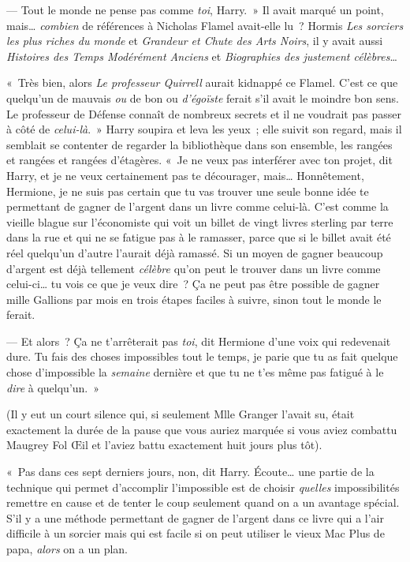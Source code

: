 --- Tout le monde ne pense pas comme \emph{toi}, Harry.~»
Il avait marqué un point, mais…
\emph{combien} de références à Nicholas Flamel avait-elle lu~?
Hormis \emph{Les sorciers les plus riches du monde} et \emph{Grandeur et Chute des Arts Noirs}, il y avait aussi \emph{Histoires des Temps Modérément Anciens} et \emph{Biographies des justement célèbres}…

«~Très bien, alors \emph{Le professeur Quirrell} aurait kidnappé ce Flamel.
C'est ce que quelqu'un de mauvais \emph{ou} de bon ou \emph{d'égoïste} ferait s'il avait le moindre bon sens.
Le professeur de Défense connaît de nombreux secrets et il ne voudrait pas passer à côté de \emph{celui-là}.~»
Harry soupira et leva les yeux~; elle suivit son regard, mais il semblait se contenter de regarder la bibliothèque dans son ensemble, les rangées et rangées et rangées d'étagères.
«~Je ne veux pas interférer avec ton projet, dit Harry, et je ne veux certainement pas te décourager, mais…
Honnêtement, Hermione, je ne suis pas certain que tu vas trouver une seule bonne idée te permettant de gagner de l'argent dans un livre comme celui-là.
C'est comme la vieille blague sur l'économiste qui voit un billet de vingt livres sterling par terre dans la rue et qui ne se fatigue pas à le ramasser, parce que si le billet avait été réel quelqu'un d'autre l'aurait déjà ramassé.
Si un moyen de gagner beaucoup d'argent est déjà tellement \emph{célèbre} qu'on peut le trouver dans un livre comme celui-ci… tu vois ce que je veux dire~?
Ça ne peut pas être possible de gagner mille Gallions par mois en trois étapes faciles à suivre, sinon tout le monde le ferait.

--- Et alors~?
Ça ne t'arrêterait pas \emph{toi}, dit Hermione d'une voix qui redevenait dure.
Tu fais des choses impossibles tout le temps, je parie que tu as fait quelque chose d'impossible la \emph{semaine} dernière et que tu ne t'es même pas fatigué à le \emph{dire} à quelqu'un.~»

(Il y eut un court silence qui, si seulement Mlle Granger l'avait su, était exactement la durée de la pause que vous auriez marquée si vous aviez combattu Maugrey Fol Œil et l'aviez battu exactement huit jours plus tôt).

«~Pas dans ces sept derniers jours, non, dit Harry.
Écoute… une partie de la technique qui permet d'accomplir l'impossible est de choisir \emph{quelles} impossibilités remettre en cause et de tenter le coup seulement quand on a un avantage spécial.
S'il y a une méthode permettant de gagner de l'argent dans ce livre qui a l'air difficile à un sorcier mais qui est facile si on peut utiliser le vieux Mac Plus de papa, \emph{alors} on a un plan.

